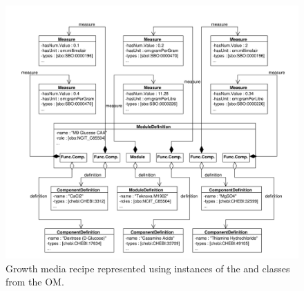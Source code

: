 \begin{figure}[ht]
\begin{center}
\includegraphics[width=\linewidth]{uml/media_example}
\caption[]{Growth media recipe represented using instances of the  and  classes from the OM.
\label{uml:media_example}}
\end{center}
\end{figure}

